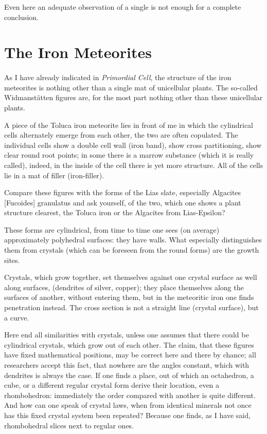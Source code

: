 \documentclass[a4paper, 12pt, oneside]{article}
\begin{document}
Even here an adequate observation of a single is not enough for a complete conclusion.
\clearpage
\section{The Iron Meteorites}
\paragraph{}
As I have already indicated in \emph{Primordial Cell}, the structure of the iron meteorites is nothing other than a single mat of unicellular plants. The so-called Widmanstätten figures are, for the most part nothing other than these unicellular plants.

A piece of the Toluca iron meteorite lies in front of me in which the cylindrical cells alternately emerge from each other, the two are often copulated. The individual cells show a double cell wall (iron band), show cross partitioning, show clear round root points; in some there is a marrow substance (which it is really called), indeed, in the inside of the cell there is yet more structure. All of the cells lie in a mat of filler (iron-filler).

Compare these figures with the forms of the Lias slate, especially Algacites [Fucoides] granulatus and ask yourself, of the two, which one shows a plant structure clearest, the Toluca iron or the Algacites from Lias-Epsilon?

These forms are cylindrical, from time to time one sees (on average) approximately polyhedral surfaces: they have walls. What especially distinguishes them from crystals (which can be foreseen from the round forms) are the growth sites.

Crystals, which grow together, set themselves against one crystal surface as well along surfaces, (dendrites of silver, copper); they place themselves along the surfaces of another, without entering them, but in the meteoritic iron one finds penetration instead. The cross section is not a straight line (crystal surface), but a curve.

Here end all similarities with crystals, unless one assumes that there could be cylindrical crystals, which grow out of each other. The claim, that these figures have fixed mathematical positions, may be correct here and there by chance; all researchers accept this fact, that nowhere are the angles constant, which with dendrites is always the case. If one finds a place, out of which an octahedron, a cube, or a different regular crystal form derive their location, even a rhombohedron: immediately the order compared with another is quite different. And how can one speak of crystal laws, when from identical minerals not once has this fixed crystal system been repeated? Because one finds, as I have said, rhombohedral slices next to regular ones.
\end{document}
